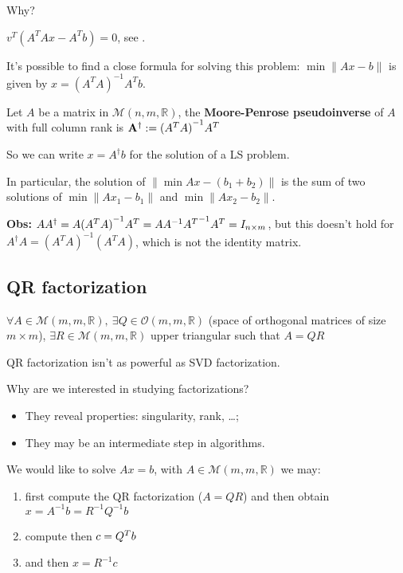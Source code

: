 \documentclass[computationalMathematics.tex]{subfiles}
\begin{document}
Why?

$v^T({A}^{T}Ax - {A}^{T}b) = 0$, see .


It's possible to find a close formula for solving this problem: $\min\|Ax-b\|$ is given by $x={({A}^{T}A)}^{-1}{A}^{T}b$.

\begin{definition}
  Let $A$ be a matrix in $\mathcal{M}(n, m, \mathds{R})$, the \textbf{Moore-Penrose pseudoinverse} of $A$ with full column rank is ${\bf {A}^{\dag}} := {({A}^{T}A)}^{-1}{A}^{T}$
\end{definition}

So we can write $x={A}^{\dag}b$ for the solution of a LS problem.

In particular, the solution of $\|\min Ax - ({b}_{1} + {b}_{2})\|$ is the sum of two solutions of $\min \| A{x}_{1} -b_{1} \|$ and  $\min \| A{x}_{2} -b_{2} \|$.

\textbf{Obs:} $A{A}^{\dag} = A {({A}^{T}A)}^{-1} {A}^{T} = A {A}^{-1} {{A}^{T}}^{-1} {A}^{T} = I_{n \times m}$, but this doesn't hold for ${A}^{\dag}A = {({A}^{T}A)}^{-1}({A}^{T}A)$, which is not the identity matrix.

\subsection{QR factorization}

\begin{theorem}
  $\forall A \in \mathcal{M}(m, m, \mathds{R}),~ \exists  Q \in \mathcal{O}(m, m, \mathds{R})$ (space of orthogonal matrices of size $m\times m$), $\exists R \in \mathcal{M}(m, m, \mathds{R})$ upper triangular such that $A=QR$
\end{theorem}

QR factorization isn't as powerful as SVD factorization.

Why are we interested in studying factorizations?

\begin{itemize}
  \item They reveal properties: singularity, rank, \dots;
  \item They may be an intermediate step in algorithms.
\end{itemize}

\begin{example}
  We would like to solve $Ax=b$, with $A \in \mathcal{M}(m, m, \mathds{R})$ we may:

\begin{enumerate}
  \item first compute the QR factorization ($A=QR$) and then obtain 
$x={A}^{-1}b={R}^{-1}{Q}^{-1}b$
  \item compute then $c= {Q}^{T}b$
  \item and then $x={R}^{-1}c$
\end{enumerate}
\end{example}
\end{document}
